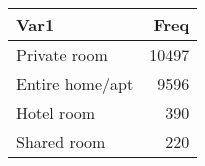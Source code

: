 \begin{table}[H]
\centering
\begin{tabular}[t]{lr}
\toprule
Var1 & Freq\\
\midrule
Private room & 10497\\
Entire home/apt & 9596\\
Hotel room & 390\\
Shared room & 220\\
\bottomrule
\end{tabular}
\end{table}